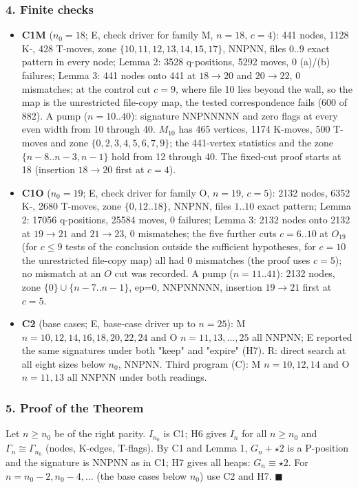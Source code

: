 \subsubsection*{4. Finite checks}
\begin{itemize}
\item \textbf{C1M} ($n_0=18$; E, check driver for family M, $n=18$, $c=4$): 441 nodes, 1128 K-, 428 T-moves, zone $\{10,11,12,13,14,15,17\}$, NNPNN, files $0..9$ exact pattern in every node; Lemma 2: 3528 q-positions, 5292 moves, 0 (a)/(b) failures; Lemma 3: 441 nodes onto 441 at $18\to20$ and $20\to22$, 0 mismatches; at the control cut $c=9$, where file 10 lies beyond the wall, so the map is the unrestricted file-copy map, the tested correspondence fails (600 of 882). A pump ($n=10..40$): signature NNPNNNNN and zero flags at every even width from 10 through 40. $M_{10}$ has 465 vertices, 1174 K-moves, 500 T-moves and zone $\{0,2,3,4,5,6,7,9\}$; the 441-vertex statistics and the zone $\{n-8..n-3,n-1\}$ hold from 12 through 40. The fixed-cut proof starts at 18 (insertion $18\to20$ first at $c=4$).
\item \textbf{C1O} ($n_0=19$; E, check driver for family O, $n=19$, $c=5$): 2132 nodes, 6352 K-, 2680 T-moves, zone $\{0,12..18\}$, NNPNN, files $1..10$ exact pattern; Lemma 2: 17056 q-positions, 25584 moves, 0 failures; Lemma 3: 2132 nodes onto 2132 at $19\to21$ and $21\to23$, 0 mismatches; the five further cuts $c=6..10$ at $O_{19}$ (for $c\le9$ tests of the conclusion outside the sufficient hypotheses, for $c=10$ the unrestricted file-copy map) all had 0 mismatches (the proof uses $c=5$); no mismatch at an $O$ cut was recorded. A pump ($n=11..41$): 2132 nodes, zone $\{0\}\cup\{n-7..n-1\}$, ep=0, NNPNNNNN, insertion $19\to21$ first at $c=5$.
\item \textbf{C2} (base cases; E, base-case driver up to $n=25$): M $n=10,12,14,16,18,20,22,24$ and O $n=11,13,...,25$ all NNPNN; E reported the same signatures under both "keep" and "expire" (H7). R: direct search at all eight sizes below $n_0$, NNPNN. Third program (C): M $n=10,12,14$ and O $n=11,13$ all NNPNN under both readings.
\end{itemize}
\subsubsection*{5. Proof of the Theorem}
Let $n\ge n_0$ be of the right parity. $I_{n_0}$ is C1; H6 gives $I_n$ for all $n\ge n_0$ and $\Gamma_n\cong\Gamma_{n_0}$ (nodes, K-edges, T-flags). By C1 and Lemma 1, $G_n+\star2$ is a P-position and the signature is NNPNN as in C1; H7 gives all heaps: $G_n\equiv\star2$. For $n=n_0-2,n_0-4,\dots$ (the base cases below $n_0$) use C2 and H7. $\blacksquare$

